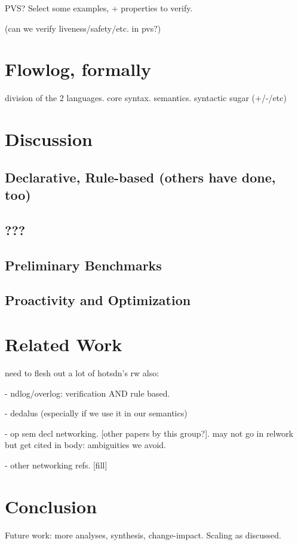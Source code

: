 \documentclass[letterpaper,twocolumn,10pt]{article}
\begin{document}
PVS? Select some examples, + properties to verify. 

(can we verify liveness/safety/etc. in pvs?)

\section{Flowlog, formally}

division of the 2 languages. core syntax. semantics. syntactic sugar (+/-/etc)

\section{Discussion}

  \subsection{Declarative, Rule-based (others have done, too)}

  \subsection{???}

  \subsection{Preliminary Benchmarks}

  \subsection{Proactivity and Optimization}

\section{Related Work}

need to flesh out a lot of hotsdn's rw also:

- ndlog/overlog: verification AND rule based.

- dedalus (especially if we use it in our semantics)

- op sem decl networking. [other papers by this group?]. may not
  go in relwork but get cited in body: ambiguities we avoid.

- other networking refs. [fill]

\section{Conclusion}



Future work: more analyses, synthesis, change-impact. Scaling as
discussed. 



{\footnotesize 
}
\end{document}
